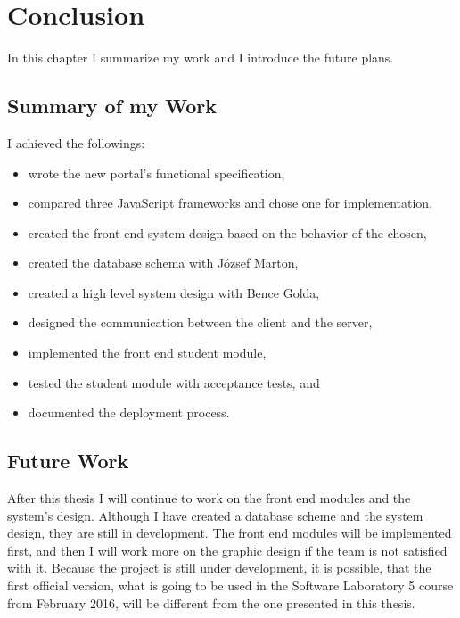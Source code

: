 \chapter{Conclusion}\label{conclusion}

In this chapter I summarize my work and I introduce the future plans.

\section{Summary of my Work}
I achieved the followings:
\begin{itemize}
	\item wrote the new portal's functional specification,
	\item compared three JavaScript frameworks and chose one for implementation,
	\item created the front end system design based on the behavior of the chosen,
	\item created the database schema with József Marton,
	\item created a high level system design with Bence Golda,
	\item designed the communication between the client and the server,
	\item implemented the front end student module,
	\item tested the student module with acceptance tests, and
	\item documented the deployment process.
\end{itemize}

\section{Future Work}
After this thesis I will continue to work on the front end modules and the system's design. Although I have created a database scheme and the system design, they are still in development. The front end modules will be implemented first, and then I will work more on the graphic design if the team is not satisfied with it. Because the project is still under development, it is possible, that the first official version, what is going to be used in the Software Laboratory 5 course from February 2016, will be different from the one presented in this thesis.